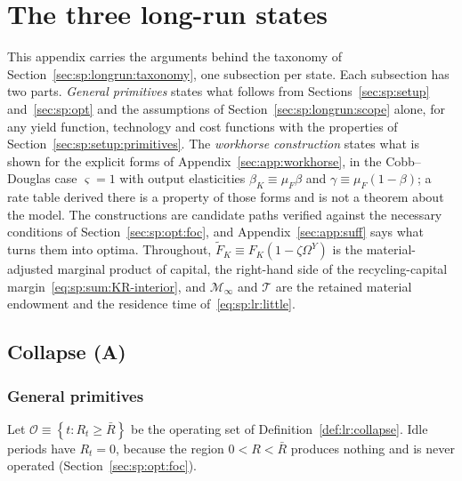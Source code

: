 \section{The three long-run states}\label{sec:app:proofs}

This appendix carries the arguments behind the taxonomy of Section~\ref{sec:sp:longrun:taxonomy}, one subsection per state. Each subsection has two parts. \emph{General primitives} states what follows from Sections~\ref{sec:sp:setup} and~\ref{sec:sp:opt} and the assumptions of Section~\ref{sec:sp:longrun:scope} alone, for any yield function, technology and cost functions with the properties of Section~\ref{sec:sp:setup:primitives}. The \emph{workhorse construction} states what is shown for the explicit forms of Appendix~\ref{sec:app:workhorse}, in the Cobb--Douglas case $\varsigma=1$ with output elasticities $\beta_K\equiv\mu_F\beta$ and $\gamma\equiv\mu_F\left(1-\beta\right)$; a rate table derived there is a property of those forms and is not a theorem about the model. The constructions are candidate paths verified against the necessary conditions of Section~\ref{sec:sp:opt:foc}, and Appendix~\ref{sec:app:suff} says what turns them into optima. Throughout, $\tilde F_K\equiv F_K\left(1-\zeta\Omega^Y\right)$ is the material-adjusted marginal product of capital, the right-hand side of the recycling-capital margin~\eqref{eq:sp:sum:KR-interior}, and $\mathcal M_\infty$ and $\mathcal T$ are the retained material endowment and the residence time of~\eqref{eq:sp:lr:little}.

\subsection{Collapse (A)}\label{sec:app:proofs:collapse}

\subsubsection{General primitives}\label{sec:app:proofs:collapse:general}

Let $\mathcal O\equiv\left\{t:R_t\ge\bar R\right\}$ be the operating set of Definition~\ref{def:lr:collapse}. Idle periods have $R_t=0$, because the region $0<R<\bar R$ produces nothing and is never operated (Section~\ref{sec:sp:opt:foc}).

